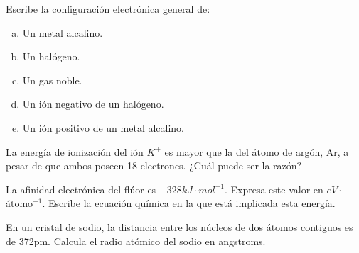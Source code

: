 \begin{prob}
Escribe la configuración electrónica general de:
\begin{enumerate}[a)]
\item Un metal alcalino.
\item Un halógeno.
\item Un gas noble.
\item Un ión negativo de un halógeno.
\item Un ión positivo de un metal alcalino.
\end{enumerate}
\end{prob}

\begin{prob}
La energía de ionización del ión $K^+$ es mayor que la del átomo de argón, Ar, a pesar de
que ambos poseen 18 electrones. ¿Cuál puede ser la razón?  
\end{prob}

\begin{prob}
La afinidad electrónica del flúor es $-328 kJ \cdot mol^{-1}$. Expresa este valor en 
$eV \cdot$ átomo$^{-1}$. Escribe la ecuación química en la que está implicada esta energía. 
\end{prob}

\begin{prob}
En un cristal de sodio, la distancia entre los núcleos de dos átomos contiguos es de 
372pm. Calcula el radio atómico del sodio en angstroms.
\end{prob}

